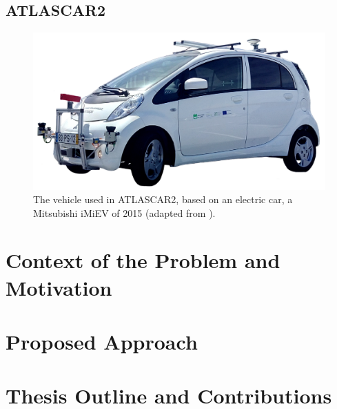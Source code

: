 \subsection{ATLASCAR2}\label{sec:ATLASCAR2}
\begin{figure}[!h]
	\centering
	\includegraphics[width=\textwidth]{../figure/atlascar2.jpg}
	\caption{The vehicle used in ATLASCAR2, based on an electric car, a Mitsubishi iMiEV of 2015 (adapted from \cite{Ricardo:Thesis:2018}).}
	\label{fig:atlascar2}
\end{figure}
\section{Context of the Problem and Motivation}
\section{Proposed Approach}
\section{Thesis Outline and Contributions}